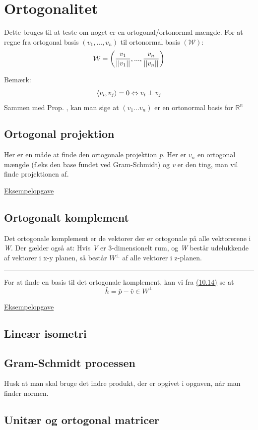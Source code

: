 \documentclass[a4paper,oneside,article]{memoir}
\begin{document}
\chapter{Ortogonalitet} \label{ch:orto}
Dette bruges til at teste om noget er en ortogonal/ortonormal mængde. 
For at regne fra ortogonal basis $(v_1,...,v_n)$ til ortonormal basis $(\mathcal{W})$: 
\[\mathcal{W} = \br{\frac{v_1}{||v_1||},...,\frac{v_n}{||v_n||}}\]

Bemærk: \[\br[3]{v_i,v_j}=0 \Leftrightarrow v_i \perp v_j\]
Sammen med Prop. , kan man sige at $(v_1 ... v_n)$ er en ortonormal basis for $\mathbb{R}^n$
\section{Ortogonal projektion} \label{sc:op}
Her er en måde at finde den ortogonale projektion \emph{p}. Her er $v_n$ en ortogonal mængde (f.eks den base fundet ved Gram-Schmidt) og \emph{v} er den ting, man vil finde projektionen af. 

\hyperref[asc:Eksamen 2023 opg 2]{Eksempelopgave}

\section{Ortogonalt komplement} \label{sc:ok}
Det ortogonale komplement er de vektorer der er ortogonale på alle vektorerene i \emph{W}. Der gælder også at: 
Hvis \emph{V} er 3-dimensionelt rum, og \emph{W} består udelukkende af vektorer i x-y planen, så består $W^\perp$ af alle vektorer i z-planen. 
\plainbreak{1}
For at finde en basis til det ortogonale komplement, kan vi fra \hyperref[fig:10.14]{(10.14)} se at \[\bar{h}=\bar{p}-\bar{v} \in W^\perp\] 

\hyperref[asc:Eksamen 2023 opg 2]{Eksempelopgave}

\section{Lineær isometri}

\section{Gram-Schmidt processen} \label{sc:gs}
Husk at man skal bruge det indre produkt, der er opgivet i opgaven, når man finder normen. 

\section{Unitær og ortogonal matricer}
\end{document}
